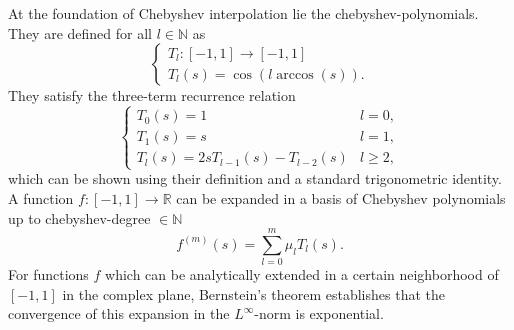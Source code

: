 At the foundation of Chebyshev interpolation lie the \glspl{chebyshev-polynomial}.
They are defined for all $l \in \mathbb{N}$ as \cite[chapter~3]{trefethen2019chebyshev}
\begin{equation}
    \begin{cases}
        T_l: [-1, 1] \to [-1, 1] \\
        T_l(s) = \cos(l \arccos(s)).
    \end{cases}
    \label{equ:2-chebyshev-chebyshev-definition}
\end{equation}
They satisfy the three-term recurrence relation
\begin{equation}
    \begin{cases}
        T_0(s) = 1 & l = 0, \\
        T_1(s) = s & l = 1, \\
        T_{l}(s) = 2s T_{l-1}(s) - T_{l-2}(s) & l \geq 2,
    \end{cases}
    \label{equ:2-chebyshev-chebyshev-recursion}
\end{equation}
which can be shown using their definition 
and a standard trigonometric identity.\\

A function $f:[-1, 1] \to \mathbb{R}$ can be expanded in a basis of Chebyshev
polynomials up to \gls{chebyshev-degree} $\in \mathbb{N}$ \cite[chapter~3]{trefethen2019chebyshev}
\begin{equation}
    f^{(m)}(s) = \sum_{l=0}^{m} \mu_l T_l(s).
    \label{equ:2-chebyshev-chebyshev-expansion-general}
\end{equation}
For functions $f$ which can be analytically extended in a certain neighborhood
of $[-1, 1]$ in the complex plane, Bernstein's theorem \cite[theorem~4.3]{trefethen2008gauss}
establishes that the convergence of this expansion in the $L^{\infty}$-norm is
exponential.

